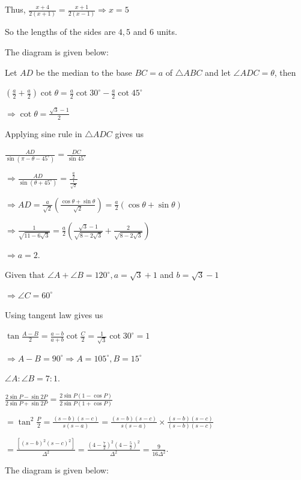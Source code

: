   Thus, $\frac{x + 4}{2(x + 1)} = \frac{x + 1}{2(x - 1)}\Rightarrow x = 5$

  So the lengths of the sides are $4, 5$ and $6$ units.
\item The diagram is given below:

  \startplacefigure
    \externalfigure[17_19.pdf]
  \stopplacefigure

  Let $AD$ be the median to the base $BC = a$ of $\triangle ABC$ and let $\angle ADC = \theta$, then

  $\left(\frac{a}{2} + \frac{a}{2}\right)\cot\theta = \frac{a}{2}\cot30^\circ - \frac{a}{2}\cot45^\circ$

  $\Rightarrow \cot\theta = \frac{\sqrt{3} - 1}{2}$

  Applying sine rule in $\triangle ADC$ gives us

  $\frac{AD}{\sin\left(\pi - \theta - 45^\circ\right)} = \frac{DC}{\sin45^\circ}$

  $\Rightarrow \frac{AD}{\sin\left(\theta + 45^\circ\right)} = \frac{\frac{a}{2}}{\frac{1}{\sqrt{2}}}$

  $\Rightarrow AD = \frac{a}{\sqrt{2}}\left(\frac{\cos\theta + \sin\theta}{\sqrt{2}}\right)
  = \frac{a}{2}(\cos\theta + \sin\theta)$

  $\Rightarrow \frac{1}{\sqrt{11 - 6\sqrt{3}}} = \frac{a}{2}\left(\frac{\sqrt{3} - 1}{\sqrt{8 - 2\sqrt{3}}}
  + \frac{2}{\sqrt{8 - 2\sqrt{3}}}\right)$

  $\Rightarrow a = 2$.
\item Given that $\angle A + \angle B = 120^\circ, a = \sqrt{3} + 1$ and $b = \sqrt{3} - 1$

  $\Rightarrow \angle C = 60^\circ$

  Using tangent law gives us

  $\tan\frac{A - B}{2} = \frac{a - b}{a + b}\cot\frac{C}{2} = \frac{1}{\sqrt{3}}\cot30^\circ = 1$

  $\Rightarrow A - B = 90^\circ\Rightarrow A = 105^\circ, B = 15^\circ$

  $\angle A:\angle B = 7:1$.
\item $\frac{2\sin P - \sin 2P}{2\sin P + \sin2P} = \frac{2\sin P(1 - \cos P)}{2\sin P(1 + \cos P)}$

  $= \tan^2\frac{P}{2} = \frac{(s - b)(s - c)}{s(s - a)} = \frac{(s - b)(s - c)}{s(s - a)}\times\frac{(s -
  b)(s - c)}{(s - b)(s - c)}$

  $= \frac{[(s - b)^2(s - c)^2]}{\Delta^2} = \frac{\left(4 - \frac{7}{2}\right)^2\left(4
  - \frac{5}{2}\right)^2}{\Delta^2} = \frac{9}{16\Delta^2}$.
\item The diagram is given below:

